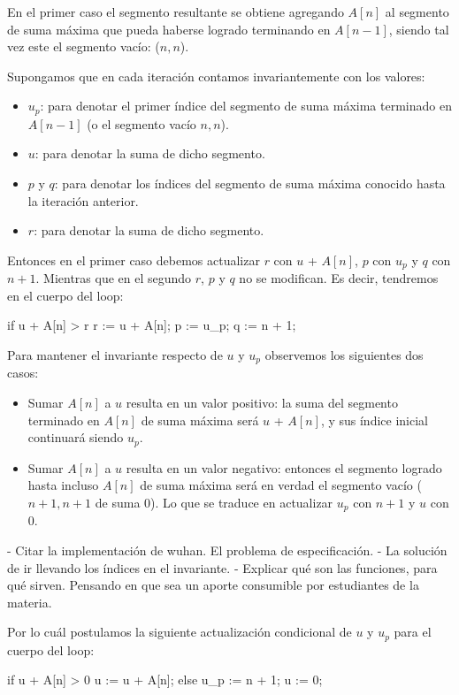 \documentclass[12pt, a4paper, openany, fleqn]{book}
\begin{document}
    En el primer caso el segmento resultante se obtiene agregando $A[n]$ al segmento de suma máxima que pueda haberse logrado terminando en $A[n-1]$, siendo tal vez este el segmento vacío: ($n,n$).

    Supongamos que en cada iteración contamos invariantemente con los valores:
    \begin{itemize}
        \item $u_p$: para denotar el primer índice del segmento de suma máxima terminado en $A[n - 1]$ (o el segmento vacío $n,n$).
        \item $u$: para denotar la suma de dicho segmento.
        \item $p$ y $q$: para denotar los índices del segmento de suma máxima conocido hasta la iteración anterior.
        \item $r$: para denotar la suma de dicho segmento.
    \end{itemize}

    Entonces en el primer caso debemos actualizar $r$ con $u$ + $A[n]$, $p$ con $u_p$ y $q$ con $n+1$. Mientras que en el segundo $r$, $p$ y $q$ no se modifican. Es decir, tendremos en el cuerpo del loop:
    \begin{dafny}
        if u + A[n] > r {
            r := u + A[n];
            p := u_p;
            q := n + 1;
        }
    \end{dafny}

    Para mantener el invariante respecto de $u$ y $u_p$ observemos los siguientes dos casos:
    \begin{itemize}
        \item Sumar $A[n]$ a $u$ resulta en un valor positivo: la suma del segmento terminado en $A[n]$ de suma máxima será $u$ + $A[n]$, y sus índice inicial continuará siendo $u_p$.
        \item Sumar $A[n]$ a $u$ resulta en un valor negativo: entonces el segmento logrado hasta incluso $A[n]$ de suma máxima será en verdad el segmento vacío ($n+1,n+1$ de suma $0$). Lo que se traduce en actualizar $u_p$ con $n+1$ y $u$ con 0.
    \end{itemize}

    - Citar la implementación de wuhan. El problema de especificación.
    - La solución de ir llevando los índices en el invariante.
    - Explicar qué son las funciones, para qué sirven. Pensando en que sea un aporte consumible por estudiantes de la materia.

    Por lo cuál postulamos la siguiente actualización condicional de $u$ y $u_p$ para el cuerpo del loop:
    \begin{dafny}
        if u + A[n] > 0 {
            u := u + A[n];
        } else {
            u_p := n + 1;
            u := 0;
        }
    \end{dafny}
\end{document}
